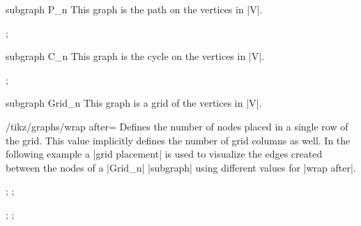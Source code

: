 \begin{graph}{subgraph P\_n}
    This graph is the path on the vertices in |V|.
\begin{codeexample}[]
\tikz {};
\end{codeexample}
\end{graph}

\begin{graph}{subgraph C\_n}
    This graph is the cycle on the vertices in |V|.
\begin{codeexample}[]
\tikz {};
\end{codeexample}
\end{graph}

\begin{graph}{subgraph Grid\_n}
    This graph is a grid of the vertices in |V|.
    \begin{key}{/tikz/graphs/wrap after=}
        Defines the number of nodes placed in a single row of the grid. This
        value implicitly defines the number of grid columns as well. In the
        following example a |grid placement| is used to visualize the edges
        created between the nodes of a |Grid_n| |subgraph| using different
        values for |wrap after|.
\begin{codeexample}[]
\tikz {};
\tikz {};
\end{codeexample}
\begin{codeexample}[]
\tikz {};
\tikz {};
\end{codeexample}
  \end{key}
\end{graph}

%
%


